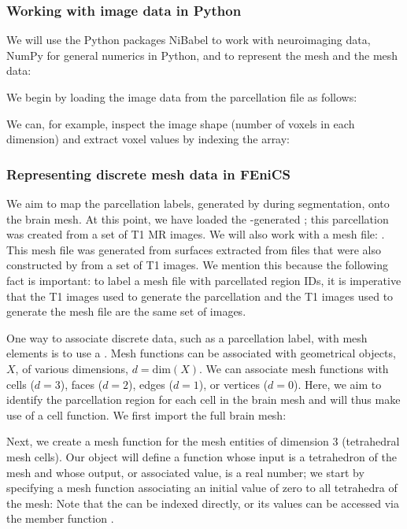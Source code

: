 \subsubsection*{Working with image data in Python}

We will use the Python packages NiBabel to work with neuroimaging
data, NumPy for general numerics in Python, and {\fenics} to represent
the mesh and the mesh data:

\noindent We begin by loading the image data from the parcellation
file as follows:

\noindent We can, for example, inspect the image shape (number of voxels in
each dimension) and extract voxel values by indexing the
 array:

\subsubsection*{Representing discrete mesh data in FEniCS}
 We aim to map the parcellation
labels, generated by \freesurfer{} during segmentation, onto the brain
mesh. At this point, we have loaded the \freesurfer{}-generated
; this parcellation was created from a set of T1 MR
images. We will also work with a mesh file:
. This mesh file was generated from surfaces
extracted from files that were also constructed by \freesurfer{}
from a set of T1 images. We mention this because the following fact is
important: to label a mesh file with parcellated region IDs, it is
imperative that the T1 images used to generate the parcellation and
the T1 images used to generate the mesh file are the same set of
images.

One way to associate discrete data, such as a parcellation label, with
mesh elements is to use a {\fenics} . Mesh functions
can be associated with geometrical objects, $X$, of various
dimensions, $d = \text{dim}(X)$. We can associate mesh functions with
cells ($d=3$), faces ($d=2$), edges ($d=1$), or vertices
($d=0$). Here, we aim to identify the parcellation region for each
cell in the brain mesh and will thus make use of a cell function. We
first import the full brain mesh:

\noindent  Next, we create a mesh function for the mesh entities of dimension 
3 (tetrahedral mesh cells). Our  object will  
define a function whose input is a tetrahedron of the mesh and whose 
output, or associated value, is a real number; we start by specifying a 
mesh function associating an initial value of zero to all tetrahedra of the 
mesh:  
Note that the  can be indexed directly, or its values can be
accessed via the member function .

